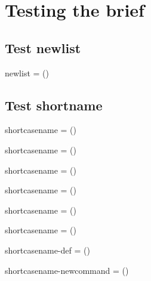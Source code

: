 \documentclass[12pt,\documentclassflag]{lawbrief}
\begin{document}
\section{Testing the brief}
\subsection{Test newlist}
\begin{LTXexample}
  newlist = (\listjoin{\newlist})
\end{LTXexample}  

\subsection{Test shortname}
\begin{LTXexample}
  shortcasename = ()\par 
  shortcasename = ()\par 
  shortcasename = ()\par 
  shortcasename = ()\par 
  shortcasename = ()\par 
  shortcasename = ()\par 
  \def\nest{}
  shortcasename-def = (\nest)\par 
  \newcommand\nested{}
  shortcasename-newcommand = (\nested)\par 
\end{LTXexample}
\end{document}
